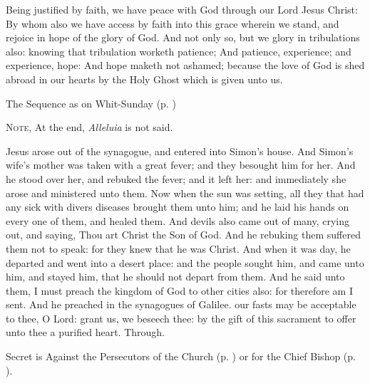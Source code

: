  Being justified by faith, we have peace with God through our Lord Jesus Christ: By whom also we have access by faith into this grace wherein we stand, and rejoice in hope of the glory of God. And not only so, but we glory in tribulations also: knowing that tribulation worketh patience; And patience, experience; and experience, hope: And hope maketh not ashamed; because the love of God is shed abroad in our hearts by the Holy Ghost which is given unto us.
\begin{rubric}
{The Sequence as on Whit-Sunday (p. \pageref{WhitSeq})}
\end{rubric}
\begin{rubric}
    \textsc{Note,} At the end, \emph{Alleluia} is not said.
\end{rubric}
 Jesus arose out of the synagogue, and entered into Simon's house. And Simon's wife's mother was taken with a great fever; and they besought him for her. And he stood over her, and rebuked the fever; and it left her: and immediately she arose and ministered unto them. Now when the sun was setting, all they that had any sick with divers diseases brought them unto him; and he laid his hands on every one of them, and healed them. And devils also came out of many, crying out, and saying, Thou art Christ the Son of God. And he rebuking them suffered them not to speak: for they knew that he was Christ. And when it was day, he departed and went into a desert place: and the people sought him, and came unto him, and stayed him, that he should not depart from them. And he said unto them, I must preach the kingdom of God to other cities also: for therefore am I sent. And he preached in the synagogues of Galilee.
\secret
{} our fasts may be acceptable to thee, O Lord: grant us, we beseech thee: by the gift of this sacrament to offer unto thee a purified heart. Through.
\begin{rubric}
     Secret is Against the Persecutors of the Church (p. \pageref{SPAgainst}) or for the Chief Bishop (p. \pageref{SPChiefBishop}).
\end{rubric}


